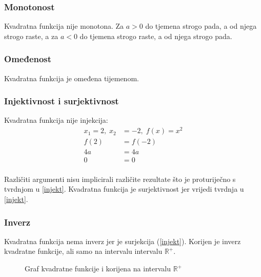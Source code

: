 \subsubsection{Monotonost \kvad}
    Kvadratna funkcija nije monotona.
    Za \(a > 0\) do tjemena strogo pada, a od njega strogo raste, a za \(a < 0\) do tjemena strogo raste, a od njega strogo pada.

\subsubsection{Omeđenost \kvad}
    Kvadratna funkcija je omeđena tijemenom.

\subsubsection{Injektivnost i surjektivnost \kvad}
    Kvadratna funkcija nije injekcija:
    \begin{equation*}
        \begin{split}
            x_1 = 2,\; x_2 &= -2,\; f(x) = x^2 \\ 
            f(2) &= f(-2) \\
            4a &= 4a \\
            0& = 0
        \end{split}
    \end{equation*}
    \\
    Različiti argumenti nisu implicirali različite rezultate što je proturiječno s tvrdnjom u \ref{injekt}.
    Kvadratna funkcija je surjektivnost jer vrijedi tvrdnja u \ref{injekt}.

\subsubsection{Inverz \kvad}
    Kvadratna funkcija nema inverz jer je surjekcija (\ref{injekt}).
    Korijen je inverz kvadratne funkcije, ali samo na intervalu intervalu \(\mathbb{R}^+\).
    \begin{figure}[ht]
        \centering
        \caption{Graf kvadratne funkcije i korijena na intervalu \(\mathbb{R}^+\)}
        \label{fig:template}
    \end{figure}